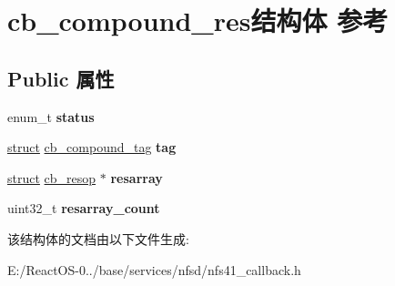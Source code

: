 \hypertarget{structcb__compound__res}{}\section{cb\+\_\+compound\+\_\+res结构体 参考}
\label{structcb__compound__res}
\subsection*{Public 属性}
\begin{DoxyCompactItemize}
\item 
\mbox{\label{structcb__compound__res_aceb8cc3a5c1415d42995970e9e530865}} 
enum\+\_\+t {\bfseries status}
\item 
\mbox{\label{structcb__compound__res_ac7b29516c24d2cd4d94ed256c6d974f9}} 
\hyperlink{interfacestruct}{struct} \hyperlink{structcb__compound__tag}{cb\+\_\+compound\+\_\+tag} {\bfseries tag}
\item 
\mbox{\label{structcb__compound__res_aa1438121464b7f655ca5a345ed69882d}} 
\hyperlink{interfacestruct}{struct} \hyperlink{structcb__resop}{cb\+\_\+resop} $\ast$ {\bfseries resarray}
\item 
\mbox{\label{structcb__compound__res_aa7cada69c4764f8f99a4b178bc394551}} 
uint32\+\_\+t {\bfseries resarray\+\_\+count}
\end{DoxyCompactItemize}


该结构体的文档由以下文件生成\+:\begin{DoxyCompactItemize}
\item 
E\+:/\+React\+O\+S-\/0../base/services/nfsd/nfs41\+\_\+callback.\+h\end{DoxyCompactItemize}
